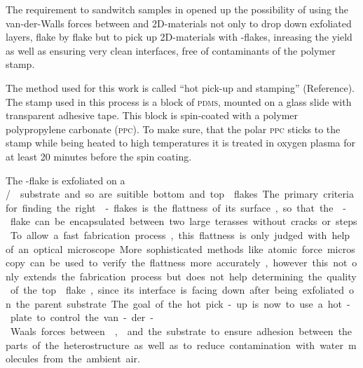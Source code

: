 The requirement to sandwitch samples in \hbn opened up the possibility of using the van-der-Walls forces between \hbn and 2D-materials not only to drop down exfoliated layers, flake by flake but to pick up 2D-materials with \hbn-flakes, inreasing the yield as well as ensuring very clean interfaces, free of contaminants of the polymer stamp. 

The method used for this work is called ``hot pick-up and stamping'' (Reference). The stamp used in this process is a block of \textsc{pdms}, mounted on a glass slide with transparent adhesive tape. This block is spin-coated with a polymer polypropylene carbonate (\textsc{ppc}). To make sure, that the polar \textsc{ppc} sticks to the stamp while being heated to high temperatures it is treated in oxygen plasma for at least 20 minutes before the spin coating.

The \tmd-flake is exfoliated on a \si/\sio substrate and so are suitible bottom and top \hbn flakes. The primary criteria for finding the right \hbn-flakes is the flattness of its surface, so that the \tmd-flake can be encapsulated between two large terasses without cracks or steps. To allow a fast fabrication process, this flattness is only judged with help of an optical microscope. More sophisticated methods like atomic force microscopy can be used to verify the flattness more accurately, however this not only extends the fabrication process but does not help determining the quality of the top \hbn flake, since its interface is facing down after being exfoliated on the parent substrate.

The goal of the hot pick-up is now to use a hot-plate to control the van-der-Waals forces between \hbn, \tmds and the substrate to ensure adhesion between the parts of the heterostructure as well as to reduce contamination with water molecules from the ambient air.

